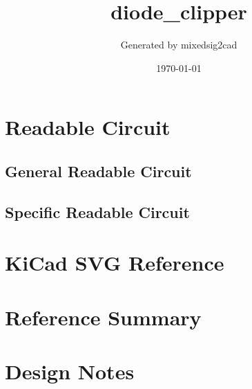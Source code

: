 \documentclass[11pt]{article}
\title{diode\_clipper}
\author{Generated by mixedsig2cad}
\date{\today}
\begin{document}
\maketitle
\section{Readable Circuit}
\subsection{General Readable Circuit}

\subsection{Specific Readable Circuit}

\section{KiCad SVG Reference}
\section{Reference Summary}

\section{Design Notes}

\end{document}
